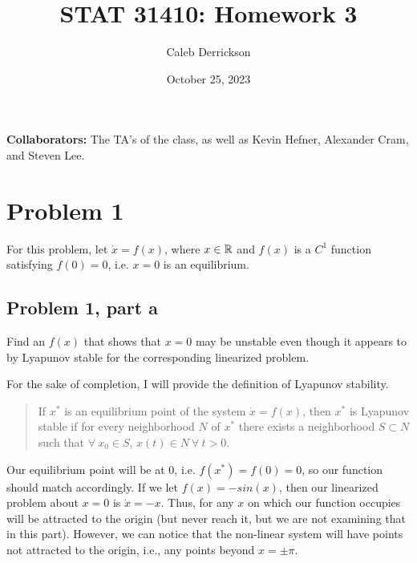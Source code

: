

\title{STAT 31410: Homework 3}
\author{Caleb Derrickson}
\date{October 25, 2023}


\onehalfspacing
\maketitle

{\color{cit}\vspace{2mm}\noindent\textbf{Collaborators:}} The TA's of the class, as well as Kevin Hefner, Alexander Cram, and Steven Lee.

\tableofcontents

\newpage
\section{Problem 1}
For this problem, let $\dot{x} = f(x)$, where $x \in \mathbb{R}$ and $f(x)$ is a $C^1$ function satisfying $f(0) = 0$, i.e. $x = 0$ is an equilibrium. 

\subsection{Problem 1, part a}
Find an $f(x)$ that shows that $x = 0$ may be unstable even though it appears to by Lyapunov stable for the corresponding linearized problem.

\partbreak
\begin{solution}

    For the sake of completion, I will provide the definition of Lyapunov stability.

    \alignbreak
    \vspace{-8mm}
    \begin{quote}
        If $x^*$ is an equilibrium point of the system $\dot{x} = f(x)$, then $x^*$ is Lyapunov stable if for every neighborhood $N$ of $x^*$ there exists a neighborhood $S\subset N$ such that $\forall \ x_0 \in S$, $x(t) \in N \ \forall \ t > 0$.   
    \end{quote}
    \vspace{-8mm}
    \alignbreak

    Our equilibrium point will be at 0, i.e. $f(x^*) = f(0) = 0$, so our function should match accordingly. If we let $f(x) = -sin(x)$, then our linearized problem about $x = 0$ is $\dot{x} = -x$. Thus, for any $x$ on which our function occupies will be attracted to the origin (but never reach it, but we are not examining that in this part). 
    However, we can notice that the non-linear system will have points not attracted to the origin, i.e., any points beyond $x = \pm\pi$. 
\end{solution}

